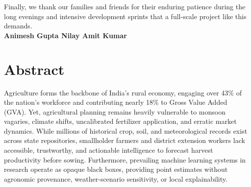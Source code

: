 \documentclass[11pt,a4paper]{report}
\begin{document}
Finally, we thank our families and friends for their enduring patience during the long evenings and intensive development sprints that a full-scale project like this demands.\\[15mm]

\noindent
\textbf{Animesh Gupta \quad\textbar\quad Nilay \quad\textbar\quad Amit Kumar}

\newpage

\chapter*{Abstract}

Agriculture forms the backbone of India’s rural economy, engaging over 43\% of the nation's workforce and contributing nearly 18\% to Gross Value Added (GVA). Yet, agricultural planning remains heavily vulnerable to monsoon vagaries, climate shifts, uncalibrated fertilizer application, and erratic market dynamics. While millions of historical crop, soil, and meteorological records exist across state repositories, smallholder farmers and district extension workers lack accessible, trustworthy, and actionable intelligence to forecast harvest productivity before sowing. Furthermore, prevailing machine learning systems in research operate as opaque black boxes, providing point estimates without agronomic provenance, weather-scenario sensitivity, or local explainability.
\end{document}
